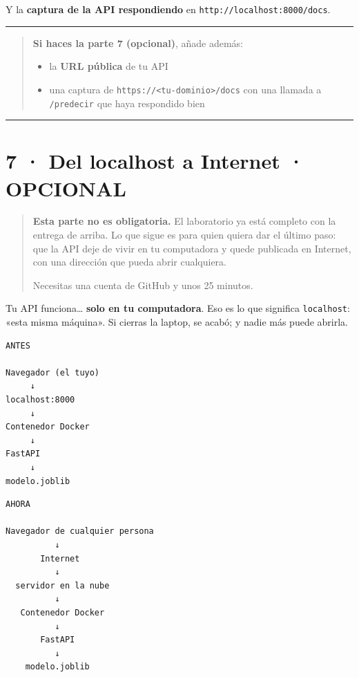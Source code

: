 \documentclass[
]{article}
\providecommand{\tightlist}{%
  \setlength{\itemsep}{0pt}\setlength{\parskip}{0pt}}
\begin{document}
Y la \textbf{captura de la API respondiendo} en
\texttt{http://localhost:8000/docs}.

\begin{center}\rule{0.5\linewidth}{0.5pt}\end{center}

\begin{quote}
\textbf{Si haces la parte 7 (opcional)}, añade además:

\begin{itemize}
\tightlist
\item
  la \textbf{URL pública} de tu API
\item
  una captura de
  \texttt{https://\textless{}tu-dominio\textgreater{}/docs} con una
  llamada a \texttt{/predecir} que haya respondido bien
\end{itemize}
\end{quote}

\protect{}\label{056808de}
\begin{center}\rule{0.5\linewidth}{0.5pt}\end{center}

\section{7 · Del localhost a Internet ·
OPCIONAL}\label{7--del-localhost-a-internet--opcional}

\begin{quote}
\textbf{Esta parte no es obligatoria.} El laboratorio ya está completo
con la entrega de arriba. Lo que sigue es para quien quiera dar el
último paso: que la API deje de vivir en tu computadora y quede
publicada en Internet, con una dirección que pueda abrir cualquiera.

Necesitas una cuenta de GitHub y unos 25 minutos.
\end{quote}

Tu API funciona\ldots{} \textbf{solo en tu computadora}. Eso es lo que
significa \texttt{localhost}: «esta misma máquina». Si cierras la
laptop, se acabó; y nadie más puede abrirla.

\begin{verbatim}
ANTES

Navegador (el tuyo)
     ↓
localhost:8000
     ↓
Contenedor Docker
     ↓
FastAPI
     ↓
modelo.joblib
\end{verbatim}

\begin{verbatim}
AHORA

Navegador de cualquier persona
          ↓
       Internet
          ↓
  servidor en la nube
          ↓
   Contenedor Docker
          ↓
       FastAPI
          ↓
    modelo.joblib
\end{verbatim}
\end{document}

